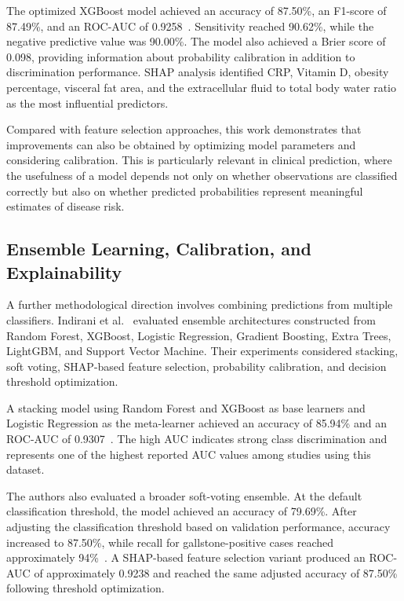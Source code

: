 The optimized XGBoost model achieved an accuracy of 87.50\%, an F1-score of 87.49\%, and an ROC-AUC of 0.9258~\cite{rahman2026hbb}. Sensitivity reached 90.62\%, while the negative predictive value was 90.00\%. The model also achieved a Brier score of 0.098, providing information about probability calibration in addition to discrimination performance. SHAP analysis identified CRP, Vitamin D, obesity percentage, visceral fat area, and the extracellular fluid to total body water ratio as the most influential predictors.

Compared with feature selection approaches, this work demonstrates that improvements can also be obtained by optimizing model parameters and considering calibration. This is particularly relevant in clinical prediction, where the usefulness of a model depends not only on whether observations are classified correctly but also on whether predicted probabilities represent meaningful estimates of disease risk.

\subsection{Ensemble Learning, Calibration, and Explainability}

A further methodological direction involves combining predictions from multiple classifiers. Indirani et al.~\cite{indirani2026ensemble} evaluated ensemble architectures constructed from Random Forest, XGBoost, Logistic Regression, Gradient Boosting, Extra Trees, LightGBM, and Support Vector Machine. Their experiments considered stacking, soft voting, SHAP-based feature selection, probability calibration, and decision threshold optimization.

A stacking model using Random Forest and XGBoost as base learners and Logistic Regression as the meta-learner achieved an accuracy of 85.94\% and an ROC-AUC of 0.9307~\cite{indirani2026ensemble}. The high AUC indicates strong class discrimination and represents one of the highest reported AUC values among studies using this dataset.

The authors also evaluated a broader soft-voting ensemble. At the default classification threshold, the model achieved an accuracy of 79.69\%. After adjusting the classification threshold based on validation performance, accuracy increased to 87.50\%, while recall for gallstone-positive cases reached approximately 94\%~\cite{indirani2026ensemble}. A SHAP-based feature selection variant produced an ROC-AUC of approximately 0.9238 and reached the same adjusted accuracy of 87.50\% following threshold optimization.

